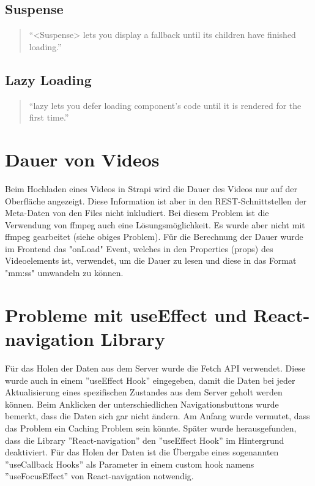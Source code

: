 \begin{spacing}{1}
    \subsection{Suspense}\label{subsec:suspense}

    \begin{quotation}

        ``<Suspense> lets you display a fallback until its children have finished
        loading.''~\cite{suspense}
    \end{quotation}

    \subsection{Lazy Loading}\label{subsec:lazy-loading}

    \begin{quotation}
        ``lazy lets you defer loading component’s code until it is rendered for
        the first time.''~\cite{lazyLoading}
    \end{quotation}


    \section{Dauer von Videos}\label{sec:dauer-von-videos}

    Beim Hochladen eines Videos in Strapi
    wird die Dauer des Videos nur auf der Oberfläche angezeigt.
    Diese Information ist aber in den REST-Schnittstellen der Meta-Daten von den Files nicht inkludiert.
    Bei diesem Problem ist die Verwendung von ffmpeg auch eine Lösungsmöglichkeit.
    Es wurde aber nicht mit ffmpeg gearbeitet (siehe obiges Problem).
    Für die Berechnung der Dauer wurde im Frontend das "onLoad" Event,
    welches in den Properties (props) des Videoelements ist, verwendet,
    um die Dauer zu lesen und diese in das Format "mm:ss" umwandeln zu können.





    \section{Probleme mit useEffect und React-navigation Library}\label{sec:probleme-mit-useeffect-und-react-navigation-library}
    Für das Holen der Daten aus dem Server wurde die Fetch API verwendet.
    Diese wurde auch in einem ''useEffect Hook'' eingegeben, damit die Daten bei jeder Aktualisierung eines spezifischen
    Zustandes aus dem Server geholt werden können.
    Beim Anklicken der unterschiedlichen Navigationsbuttons wurde bemerkt,
    dass die Daten sich gar nicht ändern.
    Am Anfang wurde vermutet, dass das Problem ein Caching Problem sein könnte.
    Später wurde herausgefunden, dass die Library ''React-navigation'' den ''useEffect Hook'' im Hintergrund deaktiviert.
    Für das Holen der Daten ist die Übergabe eines sogenannten
    ''useCallback Hooks'' als Parameter in einem custom hook namens ''useFocusEffect''
    von React-navigation notwendig.\cite{issuesWithUseEffect}



\end{spacing}
